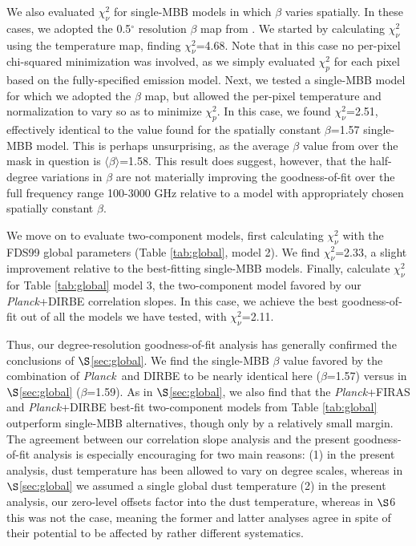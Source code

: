 \documentclass{emulateapj}
\newcommand{\PLANCK}{{\it Planck}}
\begin{document}
We also evaluated $\chi^2_{\nu}$ for single-MBB models in which
$\beta$ varies spatially. In these cases, we adopted the 0.5$^{\circ}$ 
resolution $\beta$ map from \cite{planckdust}. We started by calculating 
$\chi^2_{\nu}$ using the \cite{planckdust} temperature map, finding 
$\chi^2_{\nu}$=4.68. Note that in this case no per-pixel chi-squared 
minimization was involved, as we simply evaluated $\chi^2_{p}$ for each pixel 
based on the fully-specified \cite{planckdust} emission model. Next, we tested 
a single-MBB model for which we adopted the \cite{planckdust} $\beta$ map, but 
allowed the per-pixel temperature and normalization to vary so as to minimize 
$\chi^2_p$. In this case, we found $\chi^2_{\nu}$=2.51, effectively identical 
to the value found for the spatially constant $\beta$=1.57 single-MBB model. 
This is perhaps unsurprising, as the average $\beta$ value from 
\cite{planckdust} over the mask in question is $\langle\beta\rangle$=1.58. 
This result does suggest, however, that the half-degree variations in $\beta$ 
are not materially improving the goodness-of-fit over the full frequency range 
100-3000 GHz relative to a model with appropriately chosen spatially constant 
$\beta$.


We move on to evaluate two-component models, first calculating $\chi^2_{\nu}$ 
with the FDS99 global parameters (Table \ref{tab:global}, model 2). We find
$\chi^2_{\nu}$=2.33, a slight improvement relative to the best-fitting
single-MBB models. Finally, calculate $\chi^2_{\nu}$ for Table 
\ref{tab:global} model 3, the two-component model favored by our \PLANCK+DIRBE 
correlation slopes. In this case, we achieve the best goodness-of-fit out of 
all the models we have tested, with $\chi^2_{\nu}$=2.11.

Thus, our degree-resolution goodness-of-fit analysis has generally confirmed
the conclusions of $\S$\ref{sec:global}. We find the single-MBB $\beta$ value 
favored by the combination of \PLANCK~and DIRBE to be nearly identical here 
($\beta$=1.57) versus in $\S$\ref{sec:global} ($\beta$=1.59). As in 
$\S$\ref{sec:global}, we also find that the \PLANCK+FIRAS and \PLANCK+DIRBE 
best-fit two-component models from Table \ref{tab:global} outperform single-MBB
alternatives, though only by a relatively small margin. The agreement between 
our correlation slope analysis and the present goodness-of-fit analysis is 
especially encouraging for two main reasons: (1) in the present analysis, dust 
temperature has been allowed to vary on degree scales, whereas in 
$\S$\ref{sec:global} we assumed a single global dust temperature (2) in the
present analysis, our zero-level offsets factor into the dust temperature,
whereas in $\S$6 this was not the case, meaning the former and latter analyses 
agree in spite of their potential to be affected by rather different 
systematics.
\end{document}
